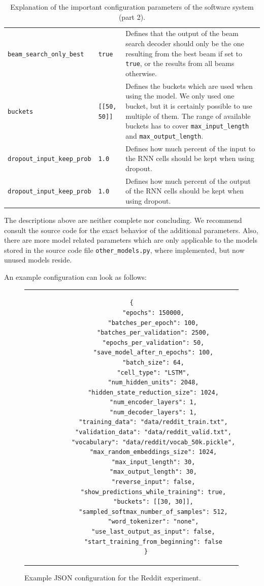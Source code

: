 \begin{table}[H]
\begin{adjustbox}{max width=\textwidth, max height=\textheight}
\begin{tabular}{llp{10cm}}
		\texttt{beam\_search\_only\_best} & \texttt{true} & Defines that the output of the beam search decoder should only be the one resulting from the best beam if set to \texttt{true}, or the results from all beams otherwise.\\
		\texttt{buckets} & \texttt{[[50, 50]]} & Defines the buckets which are used when using the model. We only used one bucket, but it is certainly possible to use multiple of them. The range of available buckets has to cover \texttt{max{\_}input\_length} and \texttt{max{\_}output\_length}.\\
		\texttt{dropout\_input\_keep\_prob} & \texttt{1.0} & Defines how much percent of the input to the RNN cells should be kept when using dropout.\\
		\texttt{dropout\_input\_keep\_prob} & \texttt{1.0} & Defines how much percent of the output of the RNN cells should be kept when using dropout.\\
		\bottomrule
		\end{tabular}
	\end{adjustbox}
	\caption{Explanation of the important configuration parameters of the software system (part 2).}
\end{table}

The descriptions above are neither complete nor concluding. We recommend consult the source code for the exact behavior of the additional parameters. Also, there are more model related parameters which are only applicable to the models stored in the source code file \texttt{other\_models.py}, where implemented, but now unused models reside.

\clearpage

An example configuration can look as follows:

\begin{figure}[thp]
	\centering
	\begin{tabular}{c}  %
		\begin{lstlisting}[style=json]
		{
			"epochs": 150000,
			"batches_per_epoch": 100,
			"batches_per_validation": 2500,
			"epochs_per_validation": 50,
			"save_model_after_n_epochs": 100,
			"batch_size": 64,
			"cell_type": "LSTM",
			"num_hidden_units": 2048,
			"hidden_state_reduction_size": 1024,
			"num_encoder_layers": 1,
			"num_decoder_layers": 1,
			"training_data": "data/reddit_train.txt",
			"validation_data": "data/reddit_valid.txt",
			"vocabulary": "data/reddit/vocab_50k.pickle",
			"max_random_embeddings_size": 1024,
			"max_input_length": 30,
			"max_output_length": 30,
			"reverse_input": false,
			"show_predictions_while_training": true,
			"buckets": [[30, 30]],
			"sampled_softmax_number_of_samples": 512,
			"word_tokenizer": "none",
			"use_last_output_as_input": false,
			"start_training_from_beginning": false
		}
		\end{lstlisting}
	\end{tabular}
	\label{software_usage:config_json_example}
	\caption{Example JSON configuration for the Reddit experiment.}
\end{figure}

